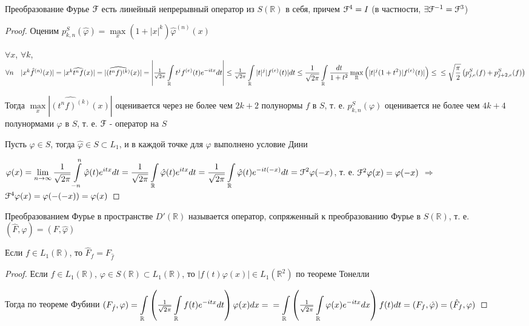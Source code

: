 \documentclass[a4paper,12pt]{report}
\newcommand*{\hm}[1]{#1\nobreak\discretionary{}%
            {\hbox{$\mathsurround=0pt #1$}}{}}
\begin{document}
\begin{thm}
Преобразование Фурье $\EuScript F$ есть линейный непрерывный оператор из $S(\mathbb R)$ в себя, причем $\EuScript F^4=I$ (в частности, $\exists \EuScript F^{-1}=\EuScript F^3$)
\end{thm}
\begin{proof}
Оценим $p_{k,n}^S(\hat\varphi)=\max\limits_x(1+|x|^k)\hat\varphi^{(n)}(x)$

$\forall x$, $\forall k$, $\forall n\quad|x^k\hat f^{(n)}(x)|=|x^k\widehat{t^n f}(x)|=|\widehat{(t^n f)^{(k)}}(x)|=\left|\frac1{\sqrt{2\pi}}\displaystyle\int\limits_{\mathbb R}t^j f^{(e)}(t)e^{-itx}dt\right|\hm\le\frac1{\sqrt{2\pi}}\displaystyle\int\limits_{\mathbb R}|t|^j|f^{(e)}(t)|dt\le\frac1{\sqrt{2\pi}}\displaystyle\int\limits_{\mathbb R}\frac{dt}{1+t^2}\max\limits_{\mathbb R}\left(|t|^j(1+t^2)|f^{(e)}(t)|\right)\le\\
\le\sqrt{\frac\pi2}\left(p_{j,e}^S(f)+p_{j+2,e}^S(f)\right)$

Тогда $\max\limits_x\left|\widehat{(t^nf)^{(k)}}(x)\right|$ оценивается через не более чем $2k+2$ полунормы $f$ в $S$, т. е. $p_{k,n}^S(\varphi)$ оценивается не более чем $4k+4$ полунормами $\varphi$ в $S$, т. е. $\EuScript F$ - оператор на $S$

Пусть $\varphi\in S$, тогда $\hat\varphi\in S\subset L_1$, и в каждой точке для $\varphi$ выполнено условие Дини

$\varphi(x)=\lim\limits_{n\to\infty}\displaystyle\frac1{\sqrt{2\pi}}\displaystyle\int\limits_{-n}^n\hat\varphi(t)e^{itx}dt=\frac1{\sqrt{2\pi}}\displaystyle\int\limits_{\mathbb R}\hat\varphi(t)e^{itx}dt=\frac1{\sqrt{2\pi}}\displaystyle\int\limits_{\mathbb R}\hat\varphi(t)e^{-it(-x)}dt\hm=\EuScript F^2\varphi(-x)$, т. е. $\EuScript F^2\varphi(x)=\varphi(-x)$ $\Rightarrow$ $\EuScript F^4\varphi(x)=\varphi(-(-x))=\varphi(x)$
\end{proof}


\begin{df}
Преобразованием Фурье в пространстве $D'(\mathbb R)$ называется оператор, сопряженный к преобразованию Фурье в $S(\mathbb R)$, т. е. $(\hat F,\varphi)=(F,\hat\varphi)$
\end{df}


\begin{prop}
Если $f\in L_1(\mathbb R)$, то $\hat F_f=F_{\hat f}$
\end{prop}
\begin{proof}
Если $f\in L_1(\mathbb R)$, $\varphi\in S(\mathbb R)\subset L_1(\mathbb R)$, то $|f(t)\varphi(x)|\in L_1(\mathbb R^2)$ по теореме Тонелли

Тогда по теореме Фубини $(F_{\hat f},\varphi)=\displaystyle\int\limits_{\mathbb R}\left(\textstyle\frac1{\sqrt{2\pi}}\displaystyle\int\limits_{\mathbb R}f(t) e^{-itx}dt\right)\varphi(x)dx=\\=\displaystyle\int\limits_{\mathbb R}\left(\textstyle\frac1{\sqrt{2\pi}}\displaystyle\int\limits_{\mathbb R}\varphi(x)e^{-itx}dx\right)f(t)dt=(F_f,\hat\varphi)=(\hat F_f,\varphi)$
\end{proof}
\end{document}
